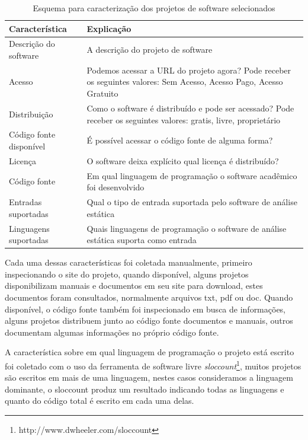 \begin{table}[h]
\caption{Esquema para caracterização dos projetos de software selecionados}
\centering
\begin{tabular}{ l p{11cm} }
  \hline
  Característica           & Explicação \\
  \hline
  Descrição do software    & A descrição do projeto de software \\
  Acesso                   & Podemos acessar a URL do projeto agora? Pode receber os seguintes valores: Sem Acesso, Acesso Pago, Acesso Gratuito \\
  Distribuição             & Como o software é distribuído e pode ser acessado? Pode receber os seguintes valores: gratis, livre, proprietário \\
  Código fonte disponível  & É possível acessar o código fonte de alguma forma? \\
  Licença                  & O software deixa explícito qual licença é distribuído? \\
  Código fonte             & Em qual linguagem de programação o software acadêmico foi desenvolvido \\
  Entradas suportadas      & Qual o tipo de entrada suportada pelo software de análise estática \\
  Linguagens suportadas    & Quais linguagens de programação o software de análise estática suporta como entrada \\
  \hline
\end{tabular}
\label{esquema-caracteristicas}
\end{table}

Cada uma dessas características foi coletada manualmente, primeiro
inspecionando o site do projeto, quando disponível, alguns projetos
disponibilizam manuais e documentos em seu site para download, estes documentos
foram consultados, normalmente arquivos txt, pdf ou doc. Quando disponível,
o código fonte também foi inspecionado em busca de informações, alguns projetos
distribuem junto ao código fonte documentos e manuais, outros documentam
algumas informações no próprio código fonte.

A característica sobre em qual linguagem de programação o projeto está escrito
foi coletado com o uso da ferramenta de software livre {\it
sloccount}\footnote{http://www.dwheeler.com/sloccount}, muitos projetos são
escritos em mais de uma linguagem, nestes casos consideramos a linguagem
dominante, o sloccount produz um resultado indicando todas as linguagens e
quanto do código total é escrito em cada uma delas.

